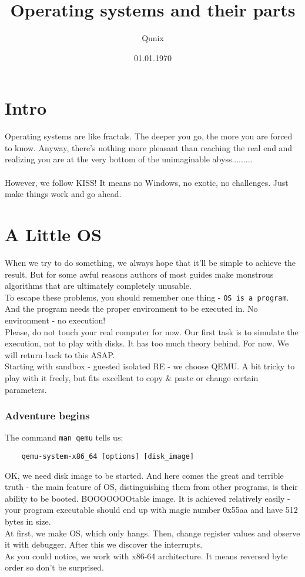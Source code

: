 \documentclass[14pt]{extarticle}
\title{Operating systems and their parts}
\author{Qunix}
\date{01.01.1970}
\begin{document}
\maketitle
\tableofcontents

\part{Intro}
Operating systems are like fractals. The deeper you go, the more you 
are forced to know. Anyway, there's nothing more pleasant than reaching 
the real end and realizing you are at the very bottom 
of the unimaginable abyss.........
\\\\
However, we follow KISS! It means no Windows, no exotic, no challenges.
Just make things work and go ahead. 

\part{A Little OS}

When we try to do something, we always hope that it'll be simple to achieve
the result.
But for some awful reasons authors of most guides make monstrous algorithms
that are ultimately completely unusable.\\
To escape these problems, you should remember one thing - 
\texttt{OS is a program}. And the program needs the proper 
environment to be executed in. No environment - no execution!
\\
Please, do not touch your real computer for now. Our first task is to 
simulate the execution, not to play with disks. It has too much theory
behind. For now. We will return back to this ASAP.
\\
Starting with sandbox - guested isolated RE - we choose QEMU. 
A bit tricky to play with it freely, but fits excellent to copy $\&$ paste 
or change certain parameters. 

\section{Adventure begins}
The command \texttt{man qemu} tells us: 
\begin{verbatim}
    qemu-system-x86_64 [options] [disk_image]
\end{verbatim}
OK, we need disk image to be started. And here comes the great and 
terrible truth - the main feature of OS, distinguishing them from 
other programs, is their ability to be booted. BOOOOOOOtable image. 
It is achieved relatively easily - your program executable should 
end up with magic number 0x55aa and have 512 bytes in size.\\
At first, we make OS, which only hangs. Then, change register values 
and observe it with debugger. After this we discover the interrupts.
\\
As you could notice, we work with x86-64 architecture. It means reversed
byte order so don't be surprised.
\newpage
\end{document}
